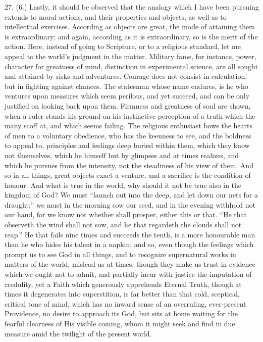 27. (6.) Lastly, it should be observed that the analogy which I
have been pursuing extends to moral actions, and their properties and
objects, as well as to intellectual exercises. According as objects
are great, the mode of attaining them is extraordinary; and again,
according as it is extraordinary, so is the merit of the action. Here,
instead of going to Scripture, or to a religious standard, let me
appeal to the world's judgment in the matter. Military fame, for
instance, power, character for greatness of mind, distinction in
experimental science, are all sought and attained by risks and
adventures. Courage does not consist in calculation, but in fighting
against chances. The statesman whose name endures, is he who ventures
upon measures which seem perilous, and yet succeed, and can be only
justified on looking back upon them. Firmness and greatness of soul
are shown, when a ruler stands his ground on his instinctive
perception of a truth which the many scoff at, and which seems
failing. The religious enthusiast bows the hearts of men to a
voluntary obedience, who has the keenness to see, and the boldness to
appeal to, principles and feelings deep buried within them, which they
know not themselves, which he himself but by glimpses and at times
realizes, and which he pursues from the intensity, not the steadiness
of his view of them. And so in all things, great objects exact a
venture, and a sacrifice is the condition of honour. And what is true
in the world, why should it not be true also in the kingdom of God? We
must ``launch out into the deep, and let down our nets for a
draught;'' we must in the morning sow our seed, and in the evening
withhold not our hand, for we know not whether shall prosper, either
this or that. ``He that observeth the wind shall not sow, and he
that regardeth the clouds shall not reap.'' He that fails nine
times and succeeds the tenth, is a more honourable man than he who
hides his talent in a napkin; and so, even though the feelings which
prompt us to see God in all things, and to recognize supernatural
works in matters of the world, mislead us at times, though they make
us trust in evidence which we ought not to admit, and partially incur
with justice the imputation of credulity, yet a Faith which generously
apprehends Eternal Truth, though at times it degenerates into
superstition, is far better than that cold, sceptical, critical tone
of mind, which has no inward sense of an overruling, ever-present
Providence, no desire to approach its God, but sits at home waiting
for the fearful clearness of His visible coming, whom it might seek
and find in due measure amid the twilight of the present world.

